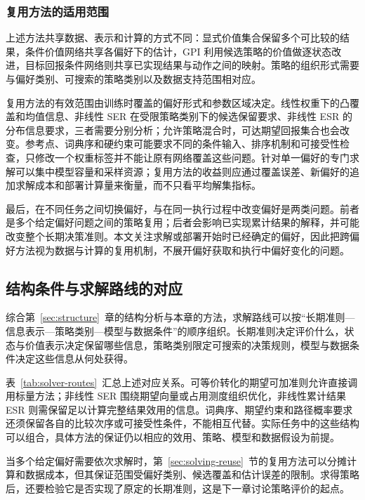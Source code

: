 \subsubsection{复用方法的适用范围}

上述方法共享数据、表示和计算的方式不同：显式价值集合保留多个可比较的结果，条件价值网络共享各偏好下的估计，GPI 利用候选策略的价值做逐状态改进，目标回报条件网络则共享已实现结果与动作之间的映射。策略的组织形式需要与偏好类别、可搜索的策略类别以及数据支持范围相对应。

复用方法的有效范围由训练时覆盖的偏好形式和参数区域决定。线性权重下的凸覆盖和均值信息、非线性 SER 在受限策略类别下的候选保留要求、非线性 ESR 的分布信息要求，三者需要分别分析；允许策略混合时，可达期望回报集合也会改变。参考点、词典序和硬约束可能要求不同的条件输入、排序机制和可接受性检查，只修改一个权重标签并不能让原有网络覆盖这些问题。针对单一偏好的专门求解可以集中模型容量和采样资源；复用方法的收益则应通过覆盖误差、新偏好的追加求解成本和部署计算量来衡量，而不只看平均解集指标。

最后，在不同任务之间切换偏好，与在同一执行过程中改变偏好是两类问题。前者是多个给定偏好问题之间的策略复用；后者会影响已实现累计结果的解释，并可能改变整个长期决策准则。本文关注求解或部署开始时已经确定的偏好，因此把跨偏好方法视为数据与计算的复用机制，不展开偏好获取和执行中偏好变化的问题。

\subsection{结构条件与求解路线的对应}\label{sec:solving-summary}

综合第~\ref{sec:structure}~章的结构分析与本章的方法，求解路线可以按“长期准则---信息表示---策略类别---模型与数据条件”的顺序组织。长期准则决定评价什么，状态与价值表示决定保留哪些信息，策略类别限定可搜索的决策规则，模型与数据条件决定这些信息从何处获得。

表~\ref{tab:solver-routes}~汇总上述对应关系。可等价转化的期望可加准则允许直接调用标量方法；非线性 SER 围绕期望向量或占用测度组织优化，非线性累计结果 ESR 则需保留足以计算完整结果效用的信息。词典序、期望约束和路径概率要求还须保留各自的比较次序或可接受性条件，不能相互代替。实际任务中的这些结构可以组合，具体方法的保证仍以相应的效用、策略、模型和数据假设为前提。



当多个给定偏好需要依次求解时，第~\ref{sec:solving-reuse}~节的复用方法可以分摊计算和数据成本，但其保证范围受偏好类别、候选覆盖和估计误差的限制。求得策略后，还要检验它是否实现了原定的长期准则，这是下一章讨论策略评价的起点。
